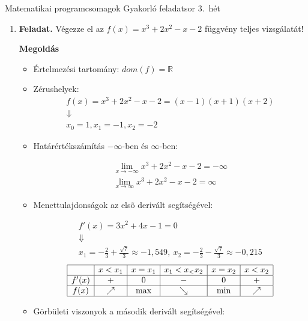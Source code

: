 \documentclass[12pt,a4paper]{article}
\begin{document}
\pagestyle{empty}
\noindent

Matematikai programcsomagok
Gyakorló feladatsor
3.\ hét

\begin{enumerate}
    \item \textbf{Feladat.} Végezze el az $f(x)=x^3+2x^2-x-2$ függvény teljes vizsgálatát! \par

          \textbf{Megoldás}
          \begin{itemize}
              \item Értelmezési tartomány:
                    $dom(f)=\mathbb{R}$
              \item Zérushelyek:
                    \begin{gather*}
                        f(x)=x^3+2x^2-x-2=(x-1)(x+1)(x+2) \\
                        \Downarrow                        \\
                        x_0=1,x_1=-1,x_2=-2
                    \end{gather*}

              \item Határértékszámítás $-\infty$-ben és $\infty$-ben:

                    \begin{gather*}
                        \lim\limits_{x \to -\infty} x^3+2x^2-x-2=-\infty\\
                        \lim\limits_{x \to \infty} x^3+2x^2-x-2=\infty
                    \end{gather*}

              \item Menettulajdonságok az elsõ derivált segítségével:

                    \begin{gather*}
                        f'(x)=3x^2+4x-1=0\\
                        \Downarrow\\
                        x_1=-\frac{2}{3}+\frac{\sqrt{7}}{3}\approx-1,549,
                        \ x_2=-\frac{2}{3}-\frac{\sqrt{7}}{3}\approx-0,215
                    \end{gather*}
                    \[
                        \begin{array}{|c|c|c|c|c|c|}
                            \hline
                                  & x<x_1    & x=x_1 & x_1<x_<x_2 & x=x_2 & x<x_2    \\
                            \hline
                            f'(x) & +        & 0     & -          & 0     & +        \\
                            \hline
                            f(x)  & \nearrow & \max  & \searrow   & \min  & \nearrow \\
                            \hline
                        \end{array}
                    \]
              \item Görbületi viszonyok a második derivált segítségével:



\end{itemize}
\end{enumerate}
\end{document}
